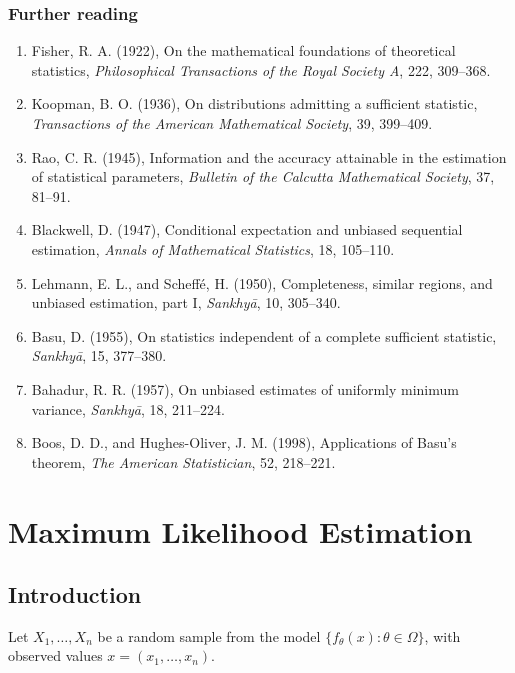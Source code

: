 \documentclass[12pt,a4paper]{report}
\theoremstyle{definition}
\begin{document}
\subsection*{Further reading}
\begin{enumerate}
\item Fisher, R. A. (1922), On the mathematical foundations of theoretical
statistics, \emph{Philosophical Transactions of the Royal Society A}, 222,
309--368.
\item Koopman, B. O. (1936), On distributions admitting a sufficient statistic,
\emph{Transactions of the American Mathematical Society}, 39, 399--409.
\item Rao, C. R. (1945), Information and the accuracy attainable in the estimation
of statistical parameters, \emph{Bulletin of the Calcutta Mathematical Society},
37, 81--91.
\item Blackwell, D. (1947), Conditional expectation and unbiased sequential
estimation, \emph{Annals of Mathematical Statistics}, 18, 105--110.
\item Lehmann, E. L., and Scheff\'e, H. (1950), Completeness, similar regions, and
unbiased estimation, part I, \emph{Sankhy\=a}, 10, 305--340.
\item Basu, D. (1955), On statistics independent of a complete sufficient
statistic, \emph{Sankhy\=a}, 15, 377--380.
\item Bahadur, R. R. (1957), On unbiased estimates of uniformly minimum variance,
\emph{Sankhy\=a}, 18, 211--224.
\item Boos, D. D., and Hughes-Oliver, J. M. (1998), Applications of Basu's theorem,
\emph{The American Statistician}, 52, 218--221.
\end{enumerate}


\chapter{Maximum Likelihood Estimation}
\label{ch:mle}

\section{Introduction}

Let $X_1, \dots, X_n$ be a random sample from the model
$\{f_\theta(x) : \theta\in\Omega\}$, with observed values $x = (x_1, \dots, x_n)$.
\end{document}
